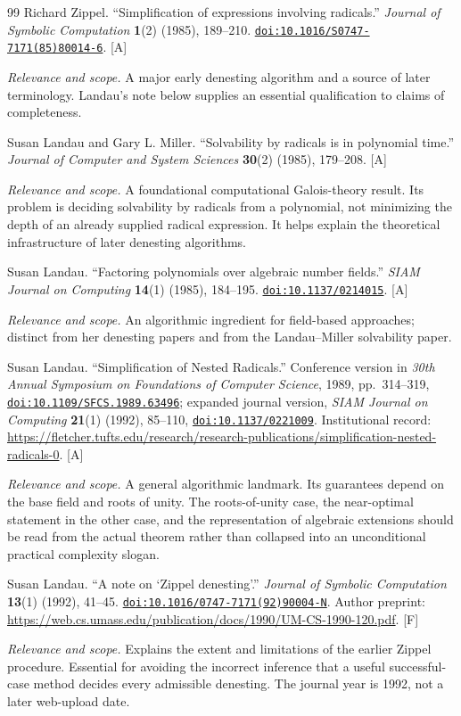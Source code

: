 \documentclass[11pt,oneside]{article}
\numberwithin{equation}{section}
\theoremstyle{definition}
\theoremstyle{remark}
\newcommand{\doi}[1]{\href{https://doi.org/#1}{\nolinkurl{doi:#1}}}
\newcommand{\status}[1]{\textsf{\small[#1]}}
\newcommand{\entrynote}[1]{\par\smallskip\noindent\emph{Relevance and scope.} #1}
\begin{document}
\begin{thebibliography}{99}
Richard Zippel. ``Simplification of expressions involving radicals.'' \emph{Journal of Symbolic Computation} \textbf{1}(2) (1985), 189--210. \doi{10.1016/S0747-7171(85)80014-6}. \status{A}
\entrynote{A major early denesting algorithm and a source of later terminology. Landau's note below supplies an essential qualification to claims of completeness.}

Susan Landau and Gary L. Miller. ``Solvability by radicals is in polynomial time.'' \emph{Journal of Computer and System Sciences} \textbf{30}(2) (1985), 179--208. \status{A}
\entrynote{A foundational computational Galois-theory result. Its problem is deciding solvability by radicals from a polynomial, not minimizing the depth of an already supplied radical expression. It helps explain the theoretical infrastructure of later denesting algorithms.}

Susan Landau. ``Factoring polynomials over algebraic number fields.'' \emph{SIAM Journal on Computing} \textbf{14}(1) (1985), 184--195. \doi{10.1137/0214015}. \status{A}
\entrynote{An algorithmic ingredient for field-based approaches; distinct from her denesting papers and from the Landau--Miller solvability paper.}

Susan Landau. ``Simplification of Nested Radicals.'' Conference version in \emph{30th Annual Symposium on Foundations of Computer Science}, 1989, pp.~314--319, \doi{10.1109/SFCS.1989.63496}; expanded journal version, \emph{SIAM Journal on Computing} \textbf{21}(1) (1992), 85--110, \doi{10.1137/0221009}. Institutional record: \url{https://fletcher.tufts.edu/research/research-publications/simplification-nested-radicals-0}. \status{A}
\entrynote{A general algorithmic landmark. Its guarantees depend on the base field and roots of unity. The roots-of-unity case, the near-optimal statement in the other case, and the representation of algebraic extensions should be read from the actual theorem rather than collapsed into an unconditional practical complexity slogan.}

Susan Landau. ``A note on `Zippel denesting'.'' \emph{Journal of Symbolic Computation} \textbf{13}(1) (1992), 41--45. \doi{10.1016/0747-7171(92)90004-N}. Author preprint: \url{https://web.cs.umass.edu/publication/docs/1990/UM-CS-1990-120.pdf}. \status{F}
\entrynote{Explains the extent and limitations of the earlier Zippel procedure. Essential for avoiding the incorrect inference that a useful successful-case method decides every admissible denesting. The journal year is 1992, not a later web-upload date.}


\end{thebibliography}
\end{document}
